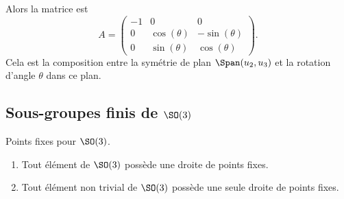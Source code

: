 \begin{subproof}
	\spitem[Si \( \epsilon=1\) et \( \lambda=-1\)] Alors la matrice est
	\begin{equation}
		A=\begin{pmatrix}
			-1 & 0            & 0             \\
			0  & \cos(\theta) & -\sin(\theta) \\
			0  & \sin(\theta) & \cos(\theta)
		\end{pmatrix}.
	\end{equation}
	Cela est la composition entre la symétrie de plan \( \Span(u_2,u_3)\) et la rotation d'angle \( \theta\) dans ce plan.
\end{subproof}

\subsection{Sous-groupes finis de \( \SO(3)\)}

\begin{lemma}       \label{LEMooWIMMooXOCfSt}
	Points fixes pour \( \SO(3)\).
	\begin{enumerate}
		\item
		      Tout élément de \( \SO(3)\) possède une droite de points fixes.
		\item
		      Tout élément non trivial de \( \SO(3)\) possède une seule droite de points fixes.
	\end{enumerate}
\end{lemma}

